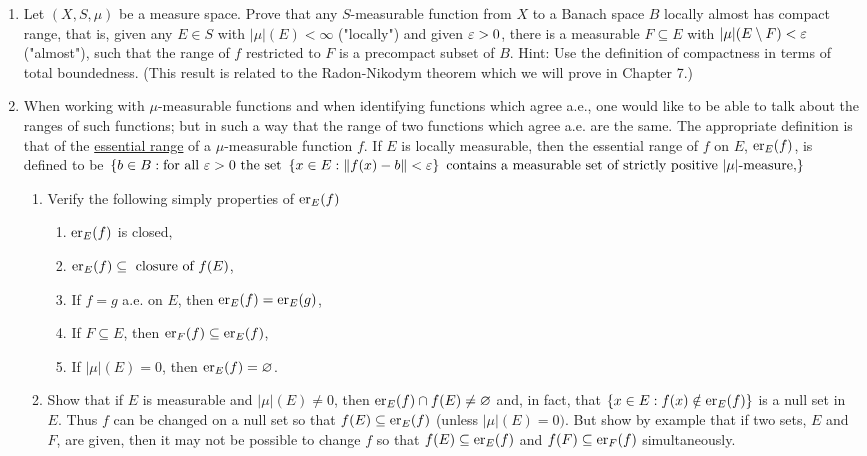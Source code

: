 \begin{enumerate}[label=\arabic*).]
\item Let $(X, S, \mu)$ be a measure space. Prove that any $S$-measurable function from $X$ to a Banach space $B$ locally almost has compact range, that is, given any $E \in S$ with $|\mu|(E)<\infty$ ("locally") and given $\ep>0$, there is a measurable $F \subseteq E$ with $|\mu|(E\sd F)<\ep$ ("almost"), such that the range of $f$ restricted to $F$ is a precompact subset of $B$. Hint: Use the definition of compactness in terms of total boundedness. (This result is related to the Radon-Nikodym theorem which we will prove in Chapter 7.)

\item When working with $\mu$-measurable functions and when identifying functions which agree a.e., one would like to be able to talk about the ranges of such functions; but in such a way that the range of two functions which agree a.e. are the same. The appropriate definition is that of the \underline{essential range} of a $\mu$-measurable function $f$. If $E$ is locally measurable, then the essential range of $f$ on $E$, $\er{f}{E}$, is defined to be $\brc{b \in B:\text{for all }\ep>0\text{ the set }\brc{x\in E:\norm{f(x)-b}<\ep}\text{ contains a measurable set of strictly positive }|\mu|\text{-measure,}}$
\begin{enumerate}
    \item Verify the following simply properties of $\er{f}{E}$
    \begin{enumerate}[label=\arabic*)]
        \item $\er{f}{E}$ is closed,
        \item $\er{f}{E}\subseteq\text{ closure of }f(E)$,
        \item If $f=g$ a.e. on $E$, then $\er{f}{E}=\er{g}{E}$,
        \item If $F \subseteq E$, then $\er{f}{F}\subseteq\er{f}{E}$,
        \item If $|\mu|(E)=0$, then $\er{f}{E}=\varnothing$.
    \end{enumerate}
    
    \item Show that if $E$ is measurable and $|\mu|(E)\neq 0$, then $\er{f}{E}\cap f(E)\neq\varnothing$ and, in fact, that $\brc{x \in E: f(x)\notin\er{f}{E}}$ is a null set in $E$. Thus $f$ can be changed on a null set so that $f(E) \subseteq\er{f}{E}$ (unless $|\mu|(E)=0)$. But show by example that if two sets, $E$ and $F$, are given, then it may not be possible to change $f$ so that $f(E)\subseteq\er{f}{E}$ and $f(F)\subseteq\er{f}{F}$ simultaneously.
    

\end{enumerate}
\end{enumerate}
